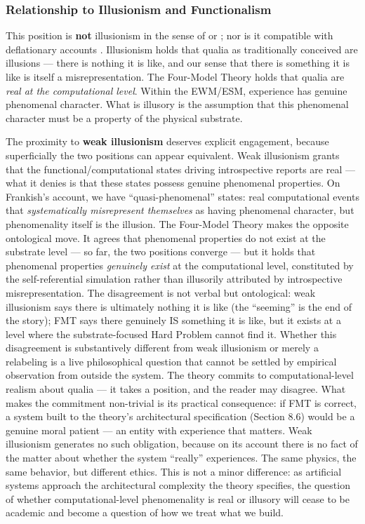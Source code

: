 \documentclass[12pt]{article}
\begin{document}
\subsubsection{Relationship to Illusionism and Functionalism}


This position is \textbf{not} illusionism in the sense of \citet{Dennett1991} or \citet{Frankish2016}; nor is it compatible with deflationary accounts \citep{Graziano2024}. Illusionism holds that qualia as traditionally conceived are illusions --- there is nothing it is like, and our sense that there is something it is like is itself a misrepresentation. The Four-Model Theory holds that qualia are \emph{real at the computational level}. Within the EWM/ESM, experience has genuine phenomenal character. What is illusory is the assumption that this phenomenal character must be a property of the physical substrate.

The proximity to \citet{Frankish2016} \textbf{weak illusionism} deserves explicit engagement, because superficially the two positions can appear equivalent. Weak illusionism grants that the functional/computational states driving introspective reports are real --- what it denies is that these states possess genuine phenomenal properties. On Frankish's account, we have ``quasi-phenomenal'' states: real computational events that \emph{systematically misrepresent themselves} as having phenomenal character, but phenomenality itself is the illusion. The Four-Model Theory makes the opposite ontological move. It agrees that phenomenal properties do not exist at the substrate level --- so far, the two positions converge --- but it holds that phenomenal properties \emph{genuinely exist} at the computational level, constituted by the self-referential simulation rather than illusorily attributed by introspective misrepresentation. The disagreement is not verbal but ontological: weak illusionism says there is ultimately nothing it is like (the ``seeming'' is the end of the story); FMT says there genuinely IS something it is like, but it exists at a level where the substrate-focused Hard Problem cannot find it. Whether this disagreement is substantively different from weak illusionism or merely a relabeling is a live philosophical question that cannot be settled by empirical observation from outside the system. The theory commits to computational-level realism about qualia --- it takes a position, and the reader may disagree. What makes the commitment non-trivial is its practical consequence: if FMT is correct, a system built to the theory's architectural specification (Section 8.6) would be a genuine moral patient --- an entity with experience that matters. Weak illusionism generates no such obligation, because on its account there is no fact of the matter about whether the system ``really'' experiences. The same physics, the same behavior, but different ethics. This is not a minor difference: as artificial systems approach the architectural complexity the theory specifies, the question of whether computational-level phenomenality is real or illusory will cease to be academic and become a question of how we treat what we build.
\end{document}
